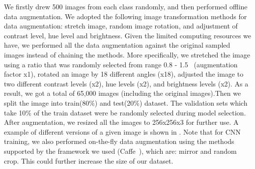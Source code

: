 We firstly drew 500 images from each class randomly, and then performed offline data augmentation. We adopted the following image transformation methods for data augmentation: stretch image, random image rotation, and adjustment of contrast level, hue level and brightness. Given the limited computing resources we have, we performed all the data augmentation against the original sampled images instead of chaining the methods. More specifically, we stretched the image using a ratio that was randomly selected from range 0.8 - 1.5~ (augmentation factor x1), rotated an image by 18 different angles (x18), adjusted the image to two different contrast levels (x2), hue levels (x2), and brightness levels (x2). As a result, we got a total of 65,000 images (including the original images).Then we split the image into train(80\%) and test(20\%) dataset. The validation sets which take 10\% of the train dataset were be randomly selected during model selection.  After augmentation, we resized all the images to 256x256x3 for further use. A example of different versions of a given image is shown in . Note that for CNN training, we also performed on-the-fly data augmentation using the methods supported by the framework we used (Caffe~\cite{jia2014caffe}), which are: mirror and random crop. This could further increase the size of our dataset. 
